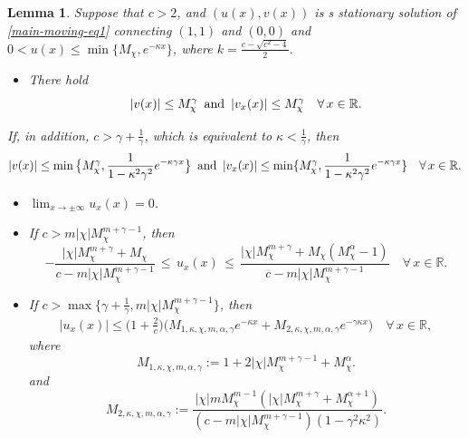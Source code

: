 \documentclass[11pt]{article} %
\newtheorem{lemma}{Lemma}[section]
\theoremstyle{remark}
\theoremstyle{remark}
\numberwithin{equation}{section}
\numberwithin{figure}{section}
\numberwithin{table}{section}
\newcommand\RR{\ensuremath{\mathbb{R}}}
\begin{document}
\begin{lemma}
\label{estimate-lm1}
Suppose that $c>2$, and  $(u(x),v(x))$ is  s stationary  solution of \eqref{main-moving-eq1}  connecting $(1,1)$ and $(0,0)$  and $0<u(x)\le \min\{M_\chi, e^{-\kappa x}\}$, where $k=\frac{c-\sqrt{c^2-4}}{2}$.

\begin{itemize}
\item[(1)] There hold
\begin{equation}
\label{estimate-eq0}
|v(x)|\le  M_\chi^\gamma 
 \,\,\, {\rm and}\,\,\,
|v_x(x)|\le  M_\chi^\gamma  \quad \forall\, x\in\RR.
\end{equation}
\end{itemize}

If, in addition,   {$c>\gamma+\frac{1}{\gamma}$,}  which is equivalent to $\kappa<\frac{1}{\gamma}$, then
\begin{equation}
\label{estimate-eq1}
|v(x)|\le  \min\big\{M_\chi^\gamma , \frac{1}{1-\kappa^2 \gamma^2}e^{-\kappa\gamma  x}\big \}
 \,\,\, {\rm and}\,\,\,
|v_x(x)|\le  \min\{M_{\chi}^\gamma ,  \frac{1}{1-\kappa^2 \gamma^2}  e^{-\kappa\gamma  x}\}  \quad \forall\, x\in\RR.
\end{equation}

\begin{itemize}
\item[(2)] $\lim_{x\to\pm \infty} u_x(x)=0$.

\item[(3)] If {$c> m|\chi| M^{m+\gamma-1}_\chi$,}  then  
\begin{equation}
\label{estimate-eq2}
 -\frac{|\chi| M_{\chi}^{m+\gamma}+M_{\chi}}{c-m|\chi| M^{m+\gamma-1} _{\chi} } \,   \le\,  u_x(x)\,  \le  \,  \frac{|\chi| M_\chi^{m+\gamma} +M_\chi(M_\chi^\alpha -1)}{c- m |\chi| M^{m+\gamma-1}_\chi }  \quad \forall\, x\in\RR.
\end{equation}


\item[(4)]  If {$c>\max\big\{\gamma+\frac{1}{\gamma}, m|\chi| M^{m+\gamma-1}_\chi\big\}$,}  then 
\begin{align}
\label{estimate-eq3}
|u_x(x)|\le  \Big(1+\frac{2}{c}\Big) \Big(M_{1,\kappa,\chi,m,\alpha,\gamma}  e^{-\kappa x}+M_{2,\kappa,\chi,m,\alpha,\gamma}e^{-\gamma\kappa x}\Big)\quad \forall\, x\in\RR,
\end{align}
where
$$
M_{1,\kappa,\chi,m,\alpha,\gamma}:= 1+2 |\chi| M^{m+\gamma-1}_\chi+M_\chi^{\alpha}.
$$
and
$$
M_{2, \kappa,\chi,m,\alpha,\gamma}:=\frac{|\chi| m M_{\chi}^{m-1} (|\chi| M_{\chi}^{m+\gamma}+M_\chi^{\alpha+1}) }{(c- m|\chi| M^{m+\gamma-1}_{\chi})(1-\gamma^2\kappa^2)}.
$$
\end{itemize}
\end{lemma}
\end{document}
